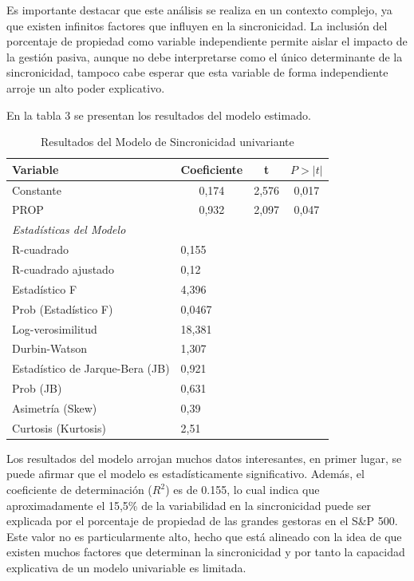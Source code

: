 \documentclass[12pt,a4paper]{article}
\begin{document}
Es importante destacar que este análisis se realiza en un contexto complejo, ya que existen infinitos factores que influyen en la sincronicidad. La inclusión del porcentaje de propiedad como variable independiente permite aislar el impacto de la gestión pasiva, aunque no debe interpretarse como el único determinante de la sincronicidad, tampoco cabe esperar que esta variable de forma independiente arroje un alto poder explicativo.

En la tabla 3 se presentan los resultados del modelo estimado.

\begin{table}[H]
\centering
\caption{Resultados del Modelo de Sincronicidad univariante}
\label{tab:regression_results}
\begin{tabular}{lccc}
\toprule
\textbf{Variable} & \textbf{Coeficiente} & \textbf{t} & \textbf{$P>\vert t\vert$} \\
\midrule
Constante & 0,174 & 2,576 & 0,017 \\
PROP & 0,932 & 2,097 & 0,047 \\
\midrule
\multicolumn{4}{l}{\textit{Estadísticas del Modelo}} \\
\midrule
R-cuadrado & \multicolumn{3}{l}{0,155} \\
R-cuadrado ajustado & \multicolumn{3}{l}{0,12} \\
Estadístico F & \multicolumn{3}{l}{4,396} \\
Prob (Estadístico F) & \multicolumn{3}{l}{0,0467} \\
Log-verosimilitud & \multicolumn{3}{l}{18,381} \\
Durbin-Watson & \multicolumn{3}{l}{1,307} \\
Estadístico de Jarque-Bera (JB) & \multicolumn{3}{l}{0,921} \\
Prob (JB) & \multicolumn{3}{l}{0,631} \\
Asimetría (Skew) & \multicolumn{3}{l}{0,39} \\
Curtosis (Kurtosis) & \multicolumn{3}{l}{2,51} \\
\bottomrule
\end{tabular}
\end{table}

Los resultados del modelo arrojan muchos datos interesantes, en primer lugar, se puede afirmar que el modelo es estadísticamente significativo. Además, el coeficiente de determinación ($R^2$) es de 0.155, lo cual indica que aproximadamente el 15,5\% de la variabilidad en la sincronicidad puede ser explicada por el porcentaje de propiedad de las grandes gestoras en el S\&P 500. Este valor no es particularmente alto, hecho que está alineado con la idea de que existen muchos factores que determinan la sincronicidad y por tanto la capacidad explicativa de un modelo univariable es limitada.
\end{document}
